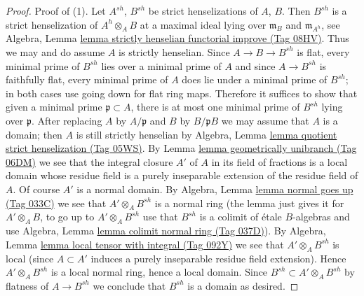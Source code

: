 \documentclass{amsart}
\theoremstyle{plain}
\theoremstyle{definition}
\theoremstyle{remark}
\numberwithin{equation}{subsection}
\begin{document}
\begin{proof}
\medskip\noindent
Proof of (1). Let $A^{sh}$, $B^{sh}$ be strict henselizations
of $A$, $B$. Then $B^{sh}$ is a strict henselization of
$A^h \otimes_A B$ at a maximal ideal lying over $\mathfrak m_B$
and $\mathfrak m_{A^h}$, see
Algebra, Lemma \href{https://stacks.math.columbia.edu/tag/08HV}{lemma strictly henselian functorial improve (Tag 08HV)}.
Thus we may and do assume $A$ is strictly henselian.
Since $A \to B \to B^{sh}$ is flat, every minimal prime of $B^{sh}$
lies over a minimal prime of $A$ and since $A \to B^{sh}$ is faithfully flat,
every minimal prime of $A$ does lie under a minimal prime of $B^{sh}$;
in both cases use going down for flat ring maps.
Therefore it suffices to show that given a minimal prime
$\mathfrak p \subset A$, there is at most one minimal prime
of $B^{sh}$ lying over $\mathfrak p$.
After replacing $A$ by $A/\mathfrak p$ and $B$ by $B/\mathfrak p B$
we may assume that $A$ is a domain; then $A$ is still strictly henselian by
Algebra, Lemma \href{https://stacks.math.columbia.edu/tag/05WS}{lemma quotient strict henselization (Tag 05WS)}.
By Lemma \href{https://stacks.math.columbia.edu/tag/06DM}{lemma geometrically unibranch (Tag 06DM)} we see that the integral closure
$A'$ of $A$ in its field of fractions is a local domain whose residue
field is a purely inseparable extension of the residue field of $A$.
Of course $A'$ is a normal domain. By
Algebra, Lemma \href{https://stacks.math.columbia.edu/tag/033C}{lemma normal goes up (Tag 033C)}
we see that $A' \otimes_A B^{sh}$ is a normal ring
(the lemma just gives it for $A' \otimes_A B$, to go up to
$A' \otimes_A B^{sh}$ use that $B^{sh}$ is a colimit of \'etale
$B$-algebras and use Algebra, Lemma \href{https://stacks.math.columbia.edu/tag/037D}{lemma colimit normal ring (Tag 037D)}).
By Algebra, Lemma \href{https://stacks.math.columbia.edu/tag/092Y}{lemma local tensor with integral (Tag 092Y)}
we see that $A' \otimes_A B^{sh}$ is local (since $A \subset A'$
induces a purely inseparable residue field extension).
Hence $A' \otimes_A B^{sh}$ is a local normal ring, hence a local domain.
Since $B^{sh} \subset A' \otimes_A B^{sh}$ by flatness of $A \to B^{sh}$
we conclude that $B^{sh}$ is a domain as desired.
\end{proof}
\end{document}
